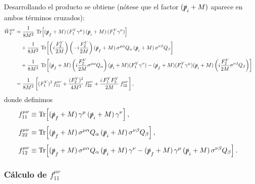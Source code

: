 Desarrollando el producto se obtiene (nótese que el factor \((\slashed{p}_i+M)\) aparece en ambos
términos cruzados):
\begin{align}
\tilde{W}^{\mu\nu}_{V}
&=
\frac{1}{8M^2}\,
\Tr\!\left[(\slashed{p}_f+M)\,(F_1^V\gamma^{\mu})\,(\slashed{p}_i+M)\,(F_1^V\gamma^{\nu})\right]
\nonumber\\[4pt]
&\quad+
\frac{1}{8M^2}\,
\Tr\!\left[
\left(i\frac{F_2^V}{2M}\right)\left(-i\frac{F_2^V}{2M}\right)
(\slashed{p}_f+M)\,\sigma^{\mu\alpha}Q_\alpha\,(\slashed{p}_i+M)\,\sigma^{\nu\beta}Q_\beta
\right]
\nonumber\\[4pt]
&\quad+
\frac{1}{8M^2}\,
\Tr\!\left[
(\slashed{p}_f+M)\left(i\frac{F_2^V}{2M}\sigma^{\mu\alpha}Q_\alpha\right)(\slashed{p}_i+M)(F_1^V\gamma^{\nu})
-
(\slashed{p}_f+M)(F_1^V\gamma^{\mu})(\slashed{p}_i+M)\left(i\frac{F_2^V}{2M}\sigma^{\nu\beta}Q_\beta\right)
\right]
\nonumber\\[6pt]
&=
\frac{1}{8M^2}\left[
(F_1^V)^2\,f_{11}^{\mu\nu}
+\frac{(F_2^V)^2}{4M^2}\,f_{22}^{\mu\nu}
+\frac{i\,F_1^V F_2^V}{2M}\,f_{12}^{\mu\nu}
\right],
\label{eq:WtildeV_munu_split_f}
\end{align}
donde definimos
\begin{align}
f_{11}^{\mu\nu}
&\equiv
\Tr\!\left[(\slashed{p}_f+M)\,\gamma^{\mu}\,(\slashed{p}_i+M)\,\gamma^{\nu}\right],
\label{eq:f11_munu_def}
\\[4pt]
f_{22}^{\mu\nu}
&\equiv
\Tr\!\left[(\slashed{p}_f+M)\,\sigma^{\mu\alpha}Q_\alpha\,(\slashed{p}_i+M)\,\sigma^{\nu\beta}Q_\beta\right],
\label{eq:f22_munu_def}
\\[4pt]
f_{12}^{\mu\nu}
&\equiv
\Tr\!\left[
(\slashed{p}_f+M)\,\sigma^{\mu\alpha}Q_\alpha\,(\slashed{p}_i+M)\,\gamma^{\nu}
-(\slashed{p}_f+M)\,\gamma^{\mu}\,(\slashed{p}_i+M)\,\sigma^{\nu\beta}Q_\beta
\right].
\label{eq:f12_munu_def}
\end{align}

\subsubsection*{Cálculo de $f_{11}^{\mu\nu}$}
\label{app:hadronico:f11_munu}


